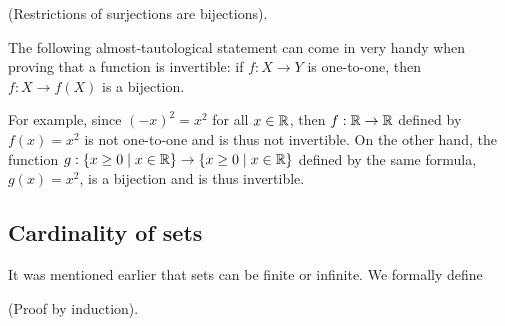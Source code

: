 \begin{remark}
    (Restrictions of surjections are bijections).

    The following almost-tautological statement can come in very handy when proving that a function is invertible: if $f:X \rightarrow Y$ is one-to-one, then $f:X \rightarrow f(X)$ is a bijection.

    For example, since $(-x)^2 = x^2$ for all $x \in \mathbb{R}$, then $f:\mathbb{R} \rightarrow \mathbb{R}$ defined by $f(x) = x^2$ is not one-to-one and is thus not invertible. On the other hand, the function $g: \{x \geq 0 \mid x \in \mathbb{R}\} \rightarrow \{x \geq 0 \mid x \in \mathbb{R}\}$ defined by the same formula, $g(x) = x^2$, is a bijection and is thus invertible.
\end{remark}

\subsection*{Cardinality of sets}

It was mentioned earlier that sets can be finite or infinite. We formally define

\begin{defn}
    (Proof by induction).
    
    
\end{defn}
